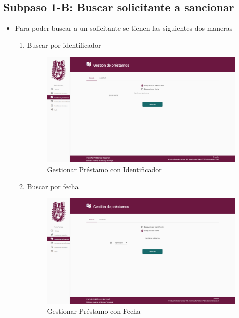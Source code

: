 \subsection{Subpaso 1-B: Buscar solicitante a sancionar}
\begin{itemize}


	\item Para poder buscar a un solicitante se tienen las siguientes dos maneras 
	\begin{enumerate}
		\item Buscar por identificador 
		\begin{figure}[hbtp]
	\includegraphics[scale=0.3]{images/Interfaz/IUGS07_gestionarPrestamoID.PNG}
	\caption{Gestionar Préstamo con Identificador}
	\end{figure}
	
	\item Buscar por fecha
	\begin{figure}[hbtp]
	\includegraphics[scale=0.3]{images/Interfaz/IUGS07_gestionarPrestamoFecha.PNG}
	\caption{Gestionar Préstamo con Fecha}
	\end{figure}
	

\end{enumerate}
\end{itemize}
